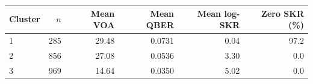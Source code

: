 \begin{tabular}{lrrrrr}
\toprule
Cluster & $n$ & Mean VOA & Mean QBER & Mean log-SKR & Zero SKR (\%) \\
\midrule
1 & 285 & 29.48 & 0.0731 & 0.04 & 97.2 \\
2 & 856 & 27.08 & 0.0536 & 3.30 & 0.0 \\
3 & 969 & 14.64 & 0.0350 & 5.02 & 0.0 \\
\bottomrule
\end{tabular}
